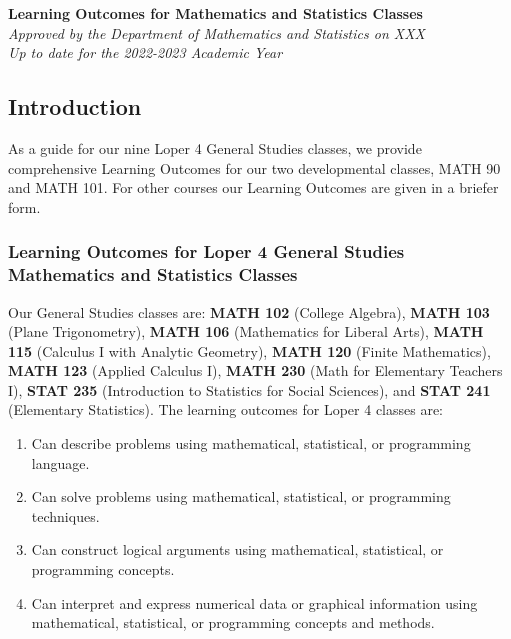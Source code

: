 \documentclass[11pt]{article}
\newenvironment{alphalist}{
\begin{enumerate}[label=(\arabic*),widest=107 ,leftmargin=25pt, itemsep=0pt]}
{\end{enumerate}}
\begin{document}
\begin{flushleft}
    \Large
\textbf{Learning Outcomes for Mathematics and Statistics Classes} \\
\vspace{0.1in}
\normalsize
\emph{Approved by the Department of Mathematics and Statistics on XXX}\\
\emph{Up to date for the 2022-2023 Academic Year}
\end{flushleft}

\subsection*{Introduction}

As a guide for our nine Loper 4 General Studies classes, we provide
comprehensive Learning Outcomes for our two developmental classes, MATH 90
and MATH 101. For other courses our Learning Outcomes are given in a
briefer form.

\subsubsection*{Learning Outcomes for Loper 4 General Studies Mathematics and Statistics Classes}

Our General Studies classes are:
\textbf{MATH 102} (College Algebra),
\textbf{MATH 103} (Plane Trigonometry),
\textbf{MATH 106} (Mathematics for Liberal Arts),
\textbf{MATH 115} (Calculus I with Analytic Geometry),
\textbf{MATH 120} (Finite Mathematics),
\textbf{MATH 123} (Applied Calculus I),
\textbf{MATH 230} (Math for Elementary Teachers I),
\textbf{STAT 235} (Introduction to  Statistics for  Social Sciences),
and \textbf{STAT 241}  (Elementary Statistics). The learning outcomes for Loper 4  classes are:

\begin{alphalist}
\item Can describe problems using mathematical, statistical, or programming language.
\item Can solve problems using mathematical, statistical, or programming techniques.
\item Can construct logical arguments using mathematical, statistical, or programming concepts.
\item Can interpret and express numerical data or graphical information using 
   mathematical, statistical, or programming concepts and methods.
\end{alphalist}
\end{document}
